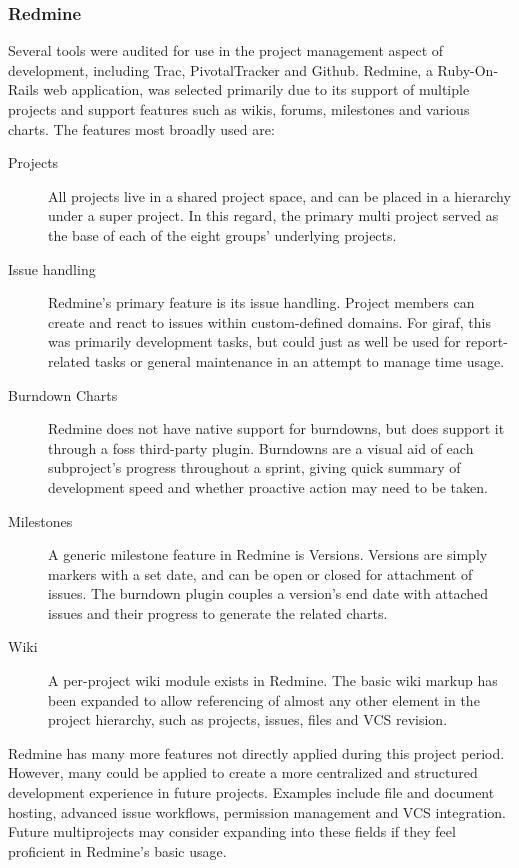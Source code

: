 \subsubsection{Redmine}
\label{subsub:redmine}
Several tools were audited for use in the project management aspect of development, including Trac, PivotalTracker and Github. Redmine, a Ruby-On-Rails web application, was selected primarily due to its support of multiple projects and support features such as wikis, forums, milestones and various charts. The features most broadly used are:
\begin{description}
	\item[Projects] All projects live in a shared project space, and can be placed in a hierarchy under a super project. In this regard, the primary multi project served as the base of each of the eight groups' underlying projects.
	\item[Issue handling] Redmine's primary feature is its issue handling. Project members can create and react to issues within custom-defined domains. For \ac{giraf}, this was primarily development tasks, but could just as well be used for report-related tasks or general maintenance in an attempt to manage time usage.
	\item[Burndown Charts] Redmine does not have native support for burndowns, but does support it through a \ac{foss} third-party plugin. Burndowns are a visual aid of each subproject's progress throughout a sprint, giving quick summary of development speed and whether proactive action may need to be taken.
	\item[Milestones] A generic milestone feature in Redmine is Versions. Versions are simply markers with a set date, and can be open or closed for attachment of issues. The burndown plugin couples a version's end date with attached issues and their progress to generate the related charts.
	\item[Wiki] A per-project wiki module exists in Redmine. The basic wiki markup has been expanded to allow referencing of almost any other element in the project hierarchy, such as projects, issues, files and VCS revision.
\end{description}

Redmine has many more features not directly applied during this project period. However, many could be applied to create a more centralized and structured development experience in future projects. Examples include file and document hosting, advanced issue workflows, permission management and VCS integration. Future multiprojects may consider expanding into these fields if they feel proficient in Redmine's basic usage.

